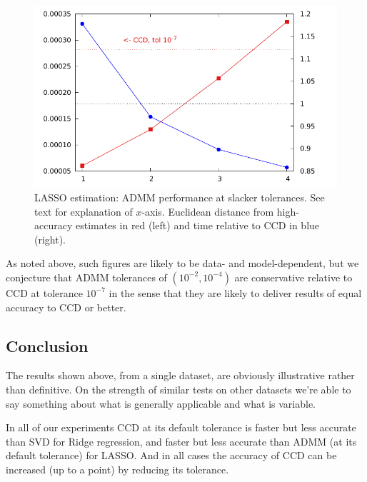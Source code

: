 \documentclass{article}
\begin{document}
\begin{figure}[htbp]
\begin{center}
\includegraphics[scale=0.9]{admm_ccd.pdf}
\caption{LASSO estimation: ADMM performance at slacker tolerances.
  See text for explanation of $x$-axis. Euclidean distance from
  high-accuracy estimates in red (left) and time relative to CCD in
  blue (right).}
\label{fig:admm-seq}
\end{center}
\end{figure}

As noted above, such figures are likely to be data- and
model-dependent, but we conjecture that ADMM tolerances of
$(10^{-2}, 10^{-4})$ are conservative relative to CCD at tolerance
$10^{-7}$ in the sense that they are likely to deliver results of
equal accuracy to CCD or better.

\subsection{Conclusion}

The results shown above, from a single dataset, are obviously
illustrative rather than definitive. On the strength of similar tests
on other datasets we're able to say something about what is generally
applicable and what is variable.

In all of our experiments CCD at its default tolerance is faster but
less accurate than SVD for Ridge regression, and faster but less
accurate than ADMM (at its default tolerance) for LASSO. And in all
cases the accuracy of CCD can be increased (up to a point) by
reducing its tolerance.
\end{document}
